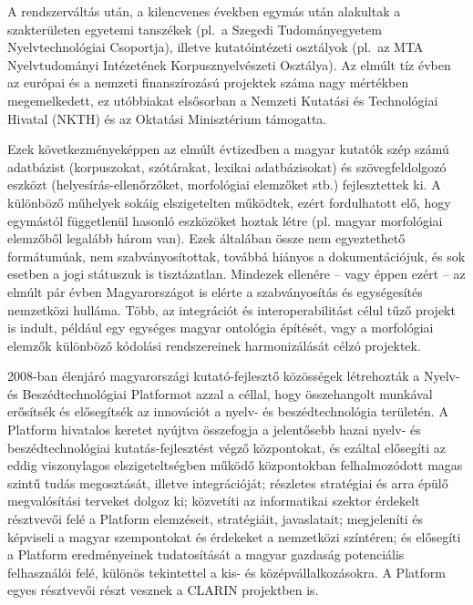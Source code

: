 \begin{multicols}{2}
A rendszerváltás után, a kilencvenes években egymás után alakultak a szakterületen egyetemi tanszékek (pl.\ a Szegedi Tudományegyetem Nyelvtechnológiai Csoportja), illetve kutatóintézeti osztályok (pl.\ az MTA Nyelvtudományi Intézetének Korpusznyelvészeti Osztálya). Az elmúlt tíz évben az európai és a nemzeti finanszírozású projektek száma nagy mértékben megemelkedett, ez utóbbiakat elsősorban a Nemzeti Kutatási és Technológiai Hivatal (NKTH) és az Oktatási Mi\-nisz\-té\-ri\-um támogatta.

Ezek következményeképpen az elmúlt évtizedben a magyar kutatók szép számú adatbázist (korpuszokat, szótárakat, lexi\-kai adatbázisokat) és szövegfeldolgozó esz\-közt (helyesírás-ellenőrzőket, morfológiai elemzőket stb.) fejlesztettek ki. A különböző műhelyek sokáig elszigetelten működtek, ezért fordulhatott elő, hogy egymástól függetlenül hasonló eszközöket hoztak létre (pl. magyar morfológiai elem\-ző\-ből legalább három van). Ezek általában össze nem egyeztethető formátumúak, nem szabványosítottak, továbbá hiányos a dokumentációjuk, és sok eset\-ben a jogi státuszuk is tisztázatlan. Mindezek ellenére -- vagy éppen ezért -- az elmúlt pár évben Magyarországot is elérte a szab\-vá\-nyo\-sí\-tás és egységesítés nemzetközi hulláma. Több, az integrációt és interoperabilitást célul tűző projekt is indult, például egy egységes magyar ontológia építését, vagy a morfológiai elemzők különböző kódolási rendszereinek harmonizálását célzó projektek. 

2008-ban élenjáró magyarországi kutató-fejlesztő közösségek létrehozták a Nyelv- és Beszédtechnológiai Platformot \cite{platform} azzal a céllal, hogy összehangolt munkával erősítsék és elősegítsék az innovációt a nyelv- és beszédtechnológia területén. A Platform hivatalos keretet nyújtva összefogja a jelentősebb hazai nyelv- és beszédtechnológiai kutatás-fejlesztést vég\-ző központokat, és ezáltal elősegíti az eddig viszonylagos elszigeteltségben működő központokban felhalmozódott magas szin\-tű tudás megosztását, illetve integrációját; részletes stratégiai és arra épülő megvalósítási terveket dolgoz ki; közvetíti az informatikai szektor érdekelt résztvevői felé a Platform elemzéseit, stratégiáit, javaslatait; megjeleníti és képviseli a ma\-gyar szempontokat és érdekeket a nem\-zet\-kö\-zi színtéren; és elősegíti a Platform eredményeinek tudatosítását a magyar gazdaság potenciális felhasználói felé, különös tekintettel a kis- és középvállalkozásokra. A Platform egyes résztvevői részt vesznek a CLARIN projektben is.  


\end{multicols}
